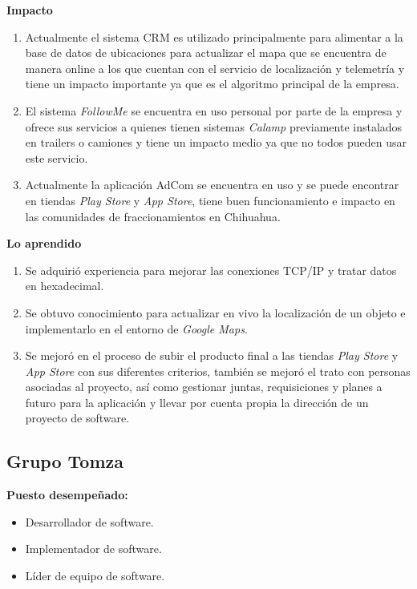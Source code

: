 \documentclass[protocolo.tex]{subfiles}
\begin{document}
\textbf{Impacto}
\begin{enumerate}
\item Actualmente el sistema CRM es utilizado principalmente para alimentar a la base de datos de
ubicaciones para actualizar el mapa que se encuentra de manera online a los que cuentan
con el servicio de localización y telemetría y tiene un impacto importante ya que es el
algoritmo principal de la empresa.

\item El sistema \textit{FollowMe} se encuentra en uso personal por parte de la empresa y ofrece sus servicios a
quienes tienen sistemas \textit{Calamp} previamente instalados en trailers o camiones y tiene un
impacto medio ya que no todos pueden usar este servicio.

\item Actualmente la aplicación AdCom se encuentra en uso y se puede encontrar en tiendas \textit{Play
Store} y \textit{App Store}, tiene buen funcionamiento e impacto en las comunidades de
fraccionamientos en Chihuahua.

\end{enumerate}

\textbf{Lo aprendido}
\begin{enumerate}
\item Se adquirió experiencia para mejorar las conexiones TCP/IP y tratar datos en hexadecimal.

\item Se obtuvo conocimiento para actualizar en vivo la localización de un objeto e implementarlo en el
entorno de \textit{Google Maps}.

\item Se mejoró en el proceso de subir el producto final a las tiendas \textit{Play Store} y \textit{App Store} con
sus diferentes criterios, también se mejoró el trato con personas asociadas al proyecto, así como
gestionar juntas, requisiciones y planes a futuro para la aplicación y llevar por cuenta propia la dirección de un proyecto de software.

\end{enumerate}
\vfill %
\subsection{Grupo Tomza }

\textbf{Puesto desempeñado:} 
\begin{itemize}
\item Desarrollador de software.
\item Implementador de software.
\item Líder de equipo de software.

\end{itemize}
\end{document}
